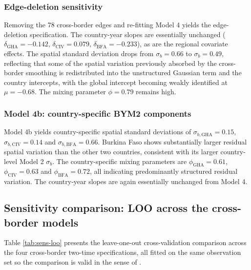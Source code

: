 \documentclass{article}
\begin{document}
\subsubsection{Edge-deletion
sensitivity}\label{edge-deletion-sensitivity-1}

Removing the 78 cross-border edges and re-fitting Model 4 yields the
edge-deletion specification. The country-year slopes are essentially
unchanged (\(\delta_{\text{GHA}} = -0.142\), \(\delta_{\text{CIV}} =
0.079\), \(\delta_{\text{BFA}} = -0.233\)), as are the regional
covariate effects. The spatial standard deviation drops from
\(\sigma_b = 0.66\) to \(\sigma_b = 0.49\), reflecting that some of the
spatial variation previously absorbed by the cross-border smoothing is
redistributed into the unstructured Gaussian term and the country
intercepts, with the global intercept becoming weakly identified at
\(\mu = -0.68\). The mixing parameter \(\phi = 0.79\) remains high.

\subsubsection{Model 4b: country-specific BYM2
components}\label{model-4b-country-specific-bym2-components-1}

Model 4b yields country-specific spatial standard deviations of
\(\sigma_{b,\text{GHA}} = 0.15\), \(\sigma_{b,\text{CIV}} = 0.14\) and
\(\sigma_{b,\text{BFA}} = 0.66\). Burkina Faso shows substantially
larger residual spatial variation than the other two countries,
consistent with its larger country-level Model 2 \(\sigma_b\). The
country-specific mixing parameters are \(\phi_{\text{GHA}} = 0.61\),
\(\phi_{\text{CIV}} = 0.63\) and \(\phi_{\text{BFA}} = 0.72\), all
indicating predominantly structured residual variation. The country-year
slopes are again essentially unchanged from Model 4.

\subsection{Sensitivity comparison: LOO across the cross-border
models}\label{sensitivity-comparison-loo-across-the-cross-border-models}

Table \ref{tab:sens-loo} presents the leave-one-out cross-validation
comparison across the four cross-border two-time specifications, all
fitted on the same observation set so the comparison is valid in the
sense of \citep{vehtari2017}.

\begingroup\fontsize{8}{10}\selectfont
\end{document}
